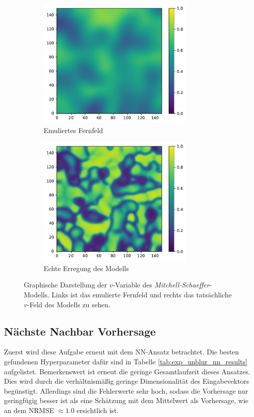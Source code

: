 \begin{figure}[h]
	\centering
	\begin{subfigure}{.5\textwidth}
		\centering
		\includegraphics[height=2.5in]{figures/results/unblur/mitchell_v_blur_blured.pdf}
		\setcapmargin[1cm]{1cm}
		\caption{Emuliertes Fernfeld}
		\label{fig:exp_unblur_mitchell_schaeffer_blurred}
	\end{subfigure}%
	\begin{subfigure}{.5\textwidth}
		\centering
		\includegraphics[height=2.5in]{figures/results/unblur/mitchell_v_blur_orig.pdf}
		\setcapmargin[1cm]{1cm}
  		\caption{Echte Erregung des Modells}
  		\label{fig:exp_unblur_mitchell_schaeffer_orig}
	\end{subfigure}
	\caption{Graphische Darstellung der $v$-Variable des \textit{Mitchell-Schaeffer}-Modells. Links ist das emulierte Fernfeld und rechts das tatsächliche $v$-Feld des Modells zu sehen.}
	\label{fig:exp_unblur_mitchell_schaeffer}
\end{figure} 

\FloatBarrier
\subsection{Nächste Nachbar Vorhersage}
Zuerst wird diese Aufgabe erneut mit dem \textsc{NN}-Ansatz betrachtet. Die besten gefundenen Hyperparameter dafür sind in Tabelle \ref{tab:exp_unblur_nn_results} aufgelistet. Bemerkenswert ist erneut die geringe Gesamtlaufzeit dieses Ansatzes. Dies wird durch die verhältnismäßig geringe Dimensionalität des Eingabevektors begünstigt. Allerdings sind die Fehlerwerte sehr hoch, sodass die Vorhersage nur geringfügig besser ist als eine Schätzung mit dem Mittelwert als Vorhersage, wie an dem NRMSE $\approx 1.0$ ersichtlich ist.

